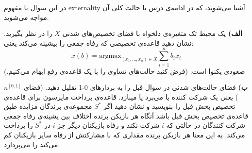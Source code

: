 در این سوال با مفهوم externality آشنا می‌شوید، که در ادامه‌ی درس با حالت کلی آن مواجه می‌شوید.

\vspace*{5pt}
\textbf{الف)}
یک محیط تک متغیره‌ی دلخواه با فضای تخصیص‌های شدنی $X$ را در نظر بگیرید. نشان دهید قاعده‌ی تخصیصی که رفاه جمعی را بیشینه می‌کند یعنی:
\[
x(b) = \text{argmax}_{(x_1, \ldots, x_n) \in X} \sum_{i=1}^{n} b_i x_i
\]
صعودی یکنوا است. (فرض کنید حالت‌های تساوی را با یک قاعده‌ی
رفع ابهام می‌کنیم.)


\vspace*{5pt}
\textbf{ب)}
فضای‌ حالت‌های شدنی در سوال قبل را به بردار‌های 0-1 تقلیل دهید. (فضای
$n^{[0,1]}$
) یعنی یک شرکت کننده یا می‌برد یا میبازد. قاعده‌ی پرداخت مایرسون برای قاعده‌ی تخصیص بخش قبل را بنویسید و نشان دهید اگر
$S^{*}$
مجموعه‌ی برندگان مزایده طبق قاعده‌ی تخصیص بخش قبل باشد آنگاه هر بازیکن برنده اختلاف بین یشینه‌ی رفاه جمعی شرکت کنند‌گان در حالتی که $i$ شرکت نکند و رفاه بازیکنان دیگر جز $i$ در
$S^{*}$
را پرداخت می‌کند. به این معنا هر بازیکن برنده مقداری که با مشارکتش از رفاه سایر بازیکنان کم می‌کند را می‌پردازد.